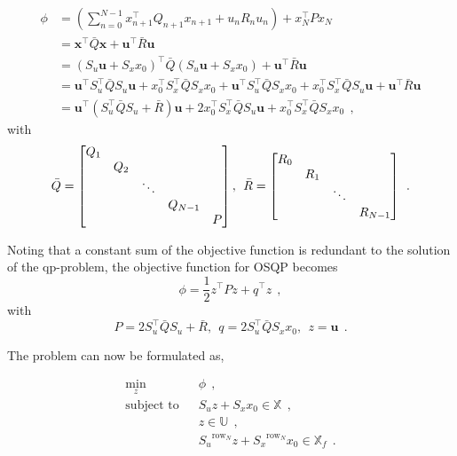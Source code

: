 \begin{equation}
\begin{split}
    \phi &= ( \sum_{n=0}^{N-1} x_{n+1}^\top Q_{n+1}
    x_{n+1} + u_n R_n u_n ) + x_N^\top P x_N \\
    &= \bm x^\top \bar{Q} \bm x + \bm u^\top \bar{R} \bm u \\
    &= (S_u \bm u + S_x x_0)^\top \bar{Q} (S_u \bm u + S_x x_0) + \bm u^\top \bar{R} \bm u \\
    &= \bm u^\top S_u^\top \bar{Q} S_u \bm u + x_0^\top S_x^\top \bar{Q} S_x x_0 + \bm u^\top S_u^\top \bar{Q} S_x x_0 + x_0^\top S_x^\top \bar{Q} S_u \bm u + \bm u^\top \bar{R} \bm u \\
    &= \bm u^\top ( S_u^\top \bar{Q} S_u + \bar{R} ) \bm u + 2 x_0^\top S_x^\top \bar{Q} S_u \bm u + x_0^\top S_x^\top \bar Q S_x x_0 \: \: ,
    \end{split}
\end{equation}
with 
\begin{equation}
    \bar Q = \begin{bmatrix}Q_1 & & & \\
               & Q_2 & & \\
               & & \ddots \\
               & & & Q_{N-1} \\
               & & & & P\end{bmatrix}, \: \: \bar R = \begin{bmatrix}R_0 & & \\
               & R_1 & \\
               & & \ddots \\
               & & & R_{N-1}\end{bmatrix} \: \: . \\
\end{equation}

Noting that a constant sum of the objective function is redundant to the solution of the \acrshort{qp}-problem, the objective function for OSQP becomes
\begin{equation}
    \phi = \frac{1}{2} z^\top P z + q^\top z \: \: ,
\end{equation}
with
\begin{equation}
    P = 2 S_u^\top \bar{Q} S_u + \bar{R}, \: \:  q = 2 S_u^\top \bar{Q} S_x x_0 , \: \: z = \bm u \: \: .
\end{equation}

The problem can now be formulated as,

\begin{equation}\label{eq:prob_no_eq_constr}
    \begin{split}
    \min_{z}  & \: \:  \phi \: \: , \\
    \text{subject to } & \: \: S_u z + S_x x_0 \in \mathbb{X} \: \: , \\
                       & \: \: z \in \mathbb{U} \: \: , \\ 
                       & \: \: {S_u}^{\text{row}_N} z + {S_x}^{\text{row}_N} x_0 \in \mathbb{X}_f  \: \: .     
    \end{split}
\end{equation}

 

                                                        
